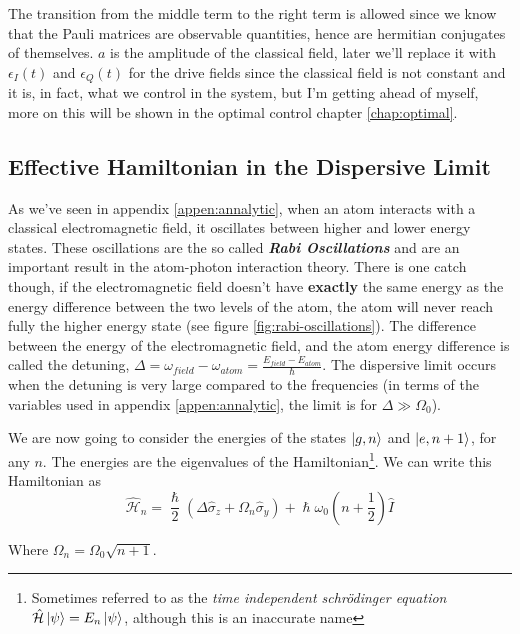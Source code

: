 The transition from the middle term to the right term is allowed since we know that the Pauli matrices are observable quantities, hence are hermitian conjugates of themselves. $a$ is the amplitude of the classical field, later we'll replace it with $\epsilon_I (t)$ and $\epsilon_Q (t)$ for the drive fields since the classical field is not constant and it is, in fact, what we control in the system, but I'm getting ahead of myself, more on this will be shown in the optimal control chapter \ref{chap:optimal}.

\subsection{Effective Hamiltonian in the Dispersive Limit} \label{sec:dispersive}
As we've seen in appendix \ref{appen:annalytic}, when an atom interacts with a classical electromagnetic field, it oscillates between higher and lower energy states. These oscillations are the so called \textbf{\textit{Rabi Oscillations}} and are an important result in the atom-photon interaction theory. There is one catch though, if the electromagnetic field doesn't have \textbf{exactly} the same  energy as the energy difference between the two levels of the atom, the atom will never reach fully the higher energy state (see figure \ref{fig:rabi-oscillations}). The difference between the energy of the electromagnetic field, and  the atom  energy difference is called the detuning, $\Delta = \omega_{field} - \omega_{atom} = \frac{E_{field} - E_{atom}}{\hslash}$. The dispersive limit occurs when the detuning is very large compared  to the frequencies (in terms of the variables used in appendix \ref{appen:annalytic}, the limit is for $\Delta \gg \Omega_0$).

We are now going to consider the energies of the states $\ket{g, n}$ and $\ket{e, n+1}$, for any $n$. The energies are the eigenvalues of the Hamiltonian\footnote{Sometimes referred to as the \textit{time independent schr\"{o}dinger equation} $\hat{\mathcal{H}}\ket{\psi} = E_n \ket{\psi}$, although this is an inaccurate name}. We can write this Hamiltonian as
\[
    \hat{\mathcal{H}}_n = \frac{\hslash}{2} (\Delta \hat{\sigma}_z + \Omega_n \hat{\sigma}_y) + \hslash \omega_0 (n + \frac{1}{2})\hat{I}
\]

Where $\Omega_n = \Omega_0 \sqrt{n + 1}$.

